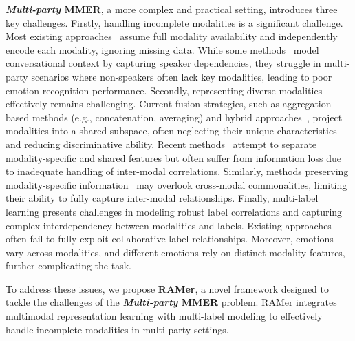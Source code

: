 \textbf{\textit{Multi-party} MMER}, a more complex and practical setting, introduces three key challenges. 
Firstly, handling incomplete modalities is a significant challenge. Most existing approaches~\cite{MMER2,Tailor,adversarial_masking} assume full modality availability and independently encode each modality, ignoring missing data. While some methods~\cite{Dialoguegcn,DialogueCRN} model conversational context by capturing speaker dependencies, they struggle in multi-party scenarios where non-speakers often lack key modalities, leading to poor emotion recognition performance. Secondly, representing diverse modalities effectively remains challenging. Current fusion strategies, such as aggregation-based methods (e.g., concatenation, averaging)\cite{MEmoR} and hybrid approaches~\cite{multimodal_survey2}, project modalities into a shared subspace, often neglecting their unique characteristics and reducing discriminative ability. Recent methods~\cite{Tailor} attempt to separate modality-specific and shared features but often suffer from information loss due to inadequate handling of inter-modal correlations. Similarly, methods preserving modality-specific information~\cite{CARAT} may overlook cross-modal commonalities, limiting their ability to fully capture inter-modal relationships.
Finally, multi-label learning presents challenges in modeling robust label correlations and capturing complex interdependency between modalities and labels. Existing approaches~\cite{bloom_filters,ma2021label} often fail to fully exploit collaborative label relationships. Moreover, emotions vary across modalities, and different emotions rely on distinct modality features, further complicating the task.

To address these issues, we propose \textbf{RAMer}, a novel framework designed to tackle the challenges of the \textbf{\textit{Multi-party} MMER} problem. RAMer integrates multimodal representation learning with multi-label modeling to effectively handle incomplete modalities in multi-party settings.

